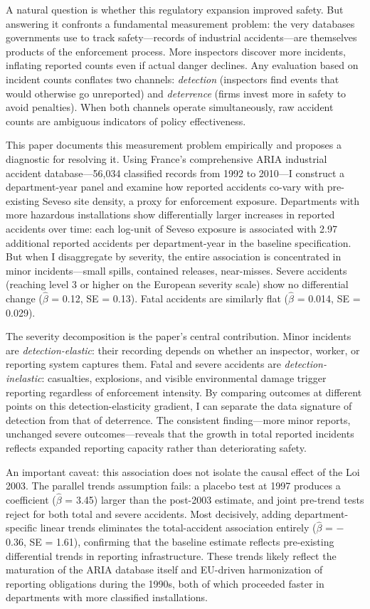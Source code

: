 \documentclass[12pt]{article}
\begin{document}
A natural question is whether this regulatory expansion improved safety. But answering it confronts a fundamental measurement problem: the very databases governments use to track safety---records of industrial accidents---are themselves products of the enforcement process. More inspectors discover more incidents, inflating reported counts even if actual danger declines. Any evaluation based on incident counts conflates two channels: \textit{detection} (inspectors find events that would otherwise go unreported) and \textit{deterrence} (firms invest more in safety to avoid penalties). When both channels operate simultaneously, raw accident counts are ambiguous indicators of policy effectiveness.

This paper documents this measurement problem empirically and proposes a diagnostic for resolving it. Using France's comprehensive ARIA industrial accident database---56,034 classified records from 1992 to 2010---I construct a department-year panel and examine how reported accidents co-vary with pre-existing Seveso site density, a proxy for enforcement exposure. Departments with more hazardous installations show differentially larger increases in reported accidents over time: each log-unit of Seveso exposure is associated with 2.97 additional reported accidents per department-year in the baseline specification. But when I disaggregate by severity, the entire association is concentrated in minor incidents---small spills, contained releases, near-misses. Severe accidents (reaching level 3 or higher on the European severity scale) show no differential change ($\hat{\beta}$ = 0.12, SE = 0.13). Fatal accidents are similarly flat ($\hat{\beta}$ = 0.014, SE = 0.029).

The severity decomposition is the paper's central contribution. Minor incidents are \textit{detection-elastic}: their recording depends on whether an inspector, worker, or reporting system captures them. Fatal and severe accidents are \textit{detection-inelastic}: casualties, explosions, and visible environmental damage trigger reporting regardless of enforcement intensity. By comparing outcomes at different points on this detection-elasticity gradient, I can separate the data signature of detection from that of deterrence. The consistent finding---more minor reports, unchanged severe outcomes---reveals that the growth in total reported incidents reflects expanded reporting capacity rather than deteriorating safety.

An important caveat: this association does not isolate the causal effect of the Loi 2003. The parallel trends assumption fails: a placebo test at 1997 produces a coefficient ($\hat{\beta}$ = 3.45) larger than the post-2003 estimate, and joint pre-trend tests reject for both total and severe accidents. Most decisively, adding department-specific linear trends eliminates the total-accident association entirely ($\hat{\beta}$ = $-$0.36, SE = 1.61), confirming that the baseline estimate reflects pre-existing differential trends in reporting infrastructure. These trends likely reflect the maturation of the ARIA database itself and EU-driven harmonization of reporting obligations during the 1990s, both of which proceeded faster in departments with more classified installations.
\end{document}
